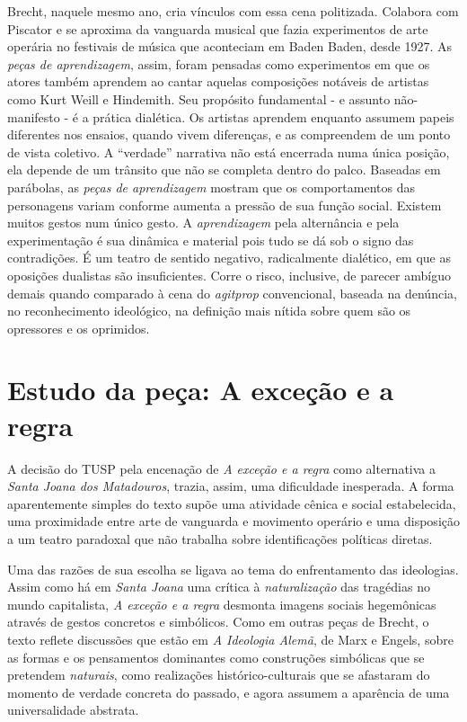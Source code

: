 Brecht, naquele mesmo ano, cria vínculos com essa cena politizada.
Colabora com Piscator e se aproxima da vanguarda musical que fazia
experimentos de arte operária no festivais de música que aconteciam em
Baden Baden, desde 1927. As \textit{peças de aprendizagem}, assim, foram
pensadas como experimentos em que os atores também aprendem ao cantar
aquelas composições notáveis de artistas como Kurt Weill e Hindemith.
Seu propósito fundamental - e assunto não-manifesto - é a prática
dialética. Os artistas aprendem enquanto assumem papeis diferentes nos
ensaios, quando vivem diferenças, e as compreendem de um ponto de vista
coletivo. A “verdade” narrativa não está encerrada numa única posição,
ela depende de um trânsito que não se completa dentro do palco. Baseadas
em parábolas, as \textit{peças de aprendizagem} mostram que os
comportamentos das personagens variam conforme aumenta a pressão de sua
função social. Existem muitos gestos num único gesto. A
\textit{aprendizagem} pela alternância e pela experimentação é sua dinâmica
e material pois tudo se dá sob o signo das contradições. É um teatro de
sentido negativo, radicalmente dialético, em que as oposições dualistas
são insuficientes. Corre o risco, inclusive, de parecer ambíguo demais
quando comparado à cena do \textit{agitprop} convencional, baseada na
denúncia, no reconhecimento ideológico, na definição mais nítida sobre
quem são os opressores e os oprimidos.

\section{Estudo da peça: A exceção e a regra}

A decisão do TUSP pela encenação de \textit{A exceção e a regra} como
alternativa a \textit{Santa Joana dos Matadouros}, trazia, assim, uma
dificuldade inesperada. A forma aparentemente simples do texto supõe uma
atividade cênica e social estabelecida, uma proximidade entre arte de
vanguarda e movimento operário e uma disposição a um teatro paradoxal
que não trabalha sobre identificações políticas diretas.

Uma das razões de sua escolha se ligava ao tema do enfrentamento das
ideologias. Assim como há em \textit{Santa Joana} uma crítica à
\textit{naturalização} das tragédias no mundo capitalista, \textit{A exceção e
a regra} desmonta imagens sociais hegemônicas através de gestos
concretos e simbólicos. Como em outras peças de Brecht, o texto reflete
discussões que estão em \textit{A Ideologia Alemã}, de Marx e Engels, sobre
as formas e os pensamentos dominantes como construções simbólicas que se
pretendem \textit{naturais}, como realizações histórico-culturais que se
afastaram do momento de verdade concreta do passado, e agora assumem a
aparência de uma universalidade abstrata.


